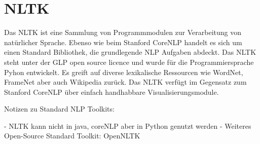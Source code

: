 \section{NLTK}

Das \ac{NLTK} ist eine Sammlung von Programmmodulen zur Verarbeitung von natürlicher Sprache. Ebenso wie beim Stanford CoreNLP handelt es sich um einen Standard Bibliothek, die grundlegende \ac{NLP} Aufgaben abdeckt. Das \ac{NLTK} steht unter der GLP open source licence und wurde für die Programmiersprache Pyhon entwickelt. Es greift auf diverse lexikalische Ressourcen wie WordNet, FrameNet aber auch Wikipedia zurück. Das \ac{NLTK} verfügt im Gegensatz zum Stanford CoreNLP über einfach handhabbare Visualisierungsmodule.

Notizen zu Standard NLP Toolkits:
 
 - NLTK kann nicht in java, coreNLP aber in Python genutzt werden
 - Weiteres Open-Source Standard Toolkit: OpenNLTK
